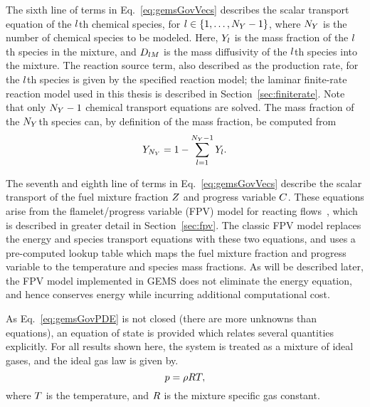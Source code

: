 The sixth line of terms in Eq.~\ref{eq:gemsGovVecs} describes the scalar transport equation of the $l$th chemical species, for $l \in \{1, \hdots, N_Y - 1\}$, where $N_Y$ is the number of chemical species to be modeled. Here, $Y_{l}$ is the mass fraction of the $l$th species in the mixture, and $D_{l M}$ is the mass diffusivity of the $l$th species into the mixture. The reaction source term, also described as the production rate, for the $l$th species is given by the specified reaction model; the laminar finite-rate reaction model used in this thesis is described in Section~\ref{sec:finiterate}. Note that only $N_Y - 1$ chemical transport equations are solved. The mass fraction of the $N_Y$th species can, by definition of the mass fraction, be computed from
%
\begin{equation}
	Y_{N_Y} = 1 - \sum_{l = 1}^{N_Y-1} Y_{l}.
\end{equation}

The seventh and eighth line of terms in Eq.~\ref{eq:gemsGovVecs} describe the scalar transport of the fuel mixture fraction $Z$ and progress variable $C$. These equations arise from the flamelet/progress variable (FPV) model for reacting flows~\cite{Pierce2001}, which is described in greater detail in Section~\ref{sec:fpv}. The classic FPV model replaces the energy and species transport equations with these two equations, and uses a pre-computed lookup table which maps the fuel mixture fraction and progress variable to the temperature and species mass fractions. As will be described later, the FPV model implemented in GEMS does not eliminate the energy equation, and hence conserves energy while incurring additional computational cost.

As Eq.~\ref{eq:gemsGovPDE} is not closed (there are more unknowns than equations), an equation of state is provided which relates several quantities explicitly. For all results shown here, the system is treated as a mixture of ideal gases, and the ideal gas law is given by.
%
\begin{equation}\label{eq:idealGas}
	p = \rho R T,
\end{equation}
%
where $T$ is the temperature, and $R$ is the mixture specific gas constant.

